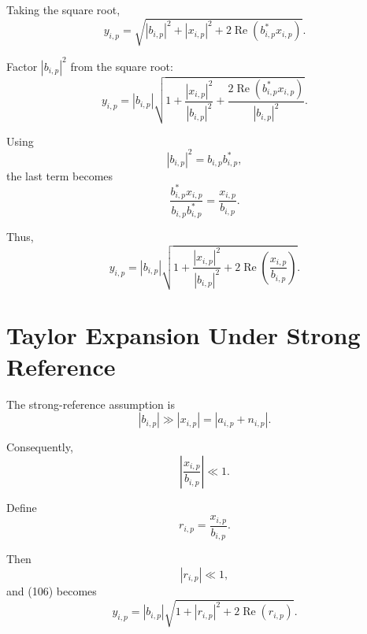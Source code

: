 \documentclass[12pt,a4paper]{article}
\begin{document}
Taking the square root,
\begin{equation}
y_{i,p}
=
\sqrt{
|b_{i,p}|^2
+
|x_{i,p}|^2
+
2\operatorname{Re}
\left(
b_{i,p}^*x_{i,p}
\right)
}.
\tag{102}
\end{equation}

Factor $|b_{i,p}|^2$ from the square root:
\begin{equation}
y_{i,p}
=
|b_{i,p}|
\sqrt{
1+
\frac{|x_{i,p}|^2}{|b_{i,p}|^2}
+
\frac{
2\operatorname{Re}(b_{i,p}^*x_{i,p})
}{
|b_{i,p}|^2
}
}.
\tag{103}
\end{equation}

Using
\begin{equation}
|b_{i,p}|^2=b_{i,p}b_{i,p}^*,
\tag{104}
\end{equation}
the last term becomes
\begin{equation}
\frac{
b_{i,p}^*x_{i,p}
}{
b_{i,p}b_{i,p}^*
}
=
\frac{x_{i,p}}{b_{i,p}}.
\tag{105}
\end{equation}

Thus,
\begin{equation}
\boxed{
y_{i,p}
=
|b_{i,p}|
\sqrt{
1+
\frac{|x_{i,p}|^2}{|b_{i,p}|^2}
+
2\operatorname{Re}
\left(
\frac{x_{i,p}}{b_{i,p}}
\right)
}
}.
\tag{106}
\end{equation}

\section{Taylor Expansion Under Strong Reference}

The strong-reference assumption is
\begin{equation}
|b_{i,p}|
\gg
|x_{i,p}|
=
|a_{i,p}+n_{i,p}|.
\tag{107}
\end{equation}

Consequently,
\begin{equation}
\left|
\frac{x_{i,p}}{b_{i,p}}
\right|
\ll 1.
\tag{108}
\end{equation}

Define
\begin{equation}
r_{i,p}
=
\frac{x_{i,p}}{b_{i,p}}.
\tag{109}
\end{equation}

Then
\begin{equation}
|r_{i,p}|\ll1,
\tag{110}
\end{equation}
and (106) becomes
\begin{equation}
y_{i,p}
=
|b_{i,p}|
\sqrt{
1+
|r_{i,p}|^2
+
2\operatorname{Re}(r_{i,p})
}.
\tag{111}
\end{equation}
\end{document}
